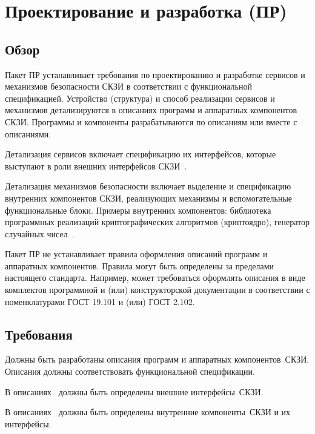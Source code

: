 \section{Проектирование и разработка (ПР)}\label{DI}

\subsection{Обзор}\label{DI.Intro}

Пакет ПР устанавливает требования по проектированию и разработке сервисов и
механизмов безопасности СКЗИ в соответствии с функциональной
спецификацией.
%
Устройство (структура) и способ реализации сервисов и механизмов 
детализируются в описаниях программ и аппаратных компонентов СКЗИ.
%
Программы и компоненты разрабатываются по описаниям или вместе с описаниями. 

Детализация сервисов включает спецификацию их интерфейсов, которые 
выступают в роли внешних интерфейсов СКЗИ~.

Детализация механизмов безопасности включает выделение и спецификацию 
внутренних компонентов СКЗИ, реализующих механизмы и вспомогательные 
функциональные блоки.
%
Примеры внутренних компонентов: 
библиотека программных реализаций криптографических алгоритмов (криптоядро),
генератор случайных чисел~.

Пакет ПР не устанавливает правила оформления описаний программ и 
аппаратных компонентов. Правила могут быть определены за пределами настоящего 
стандарта. Например, может требоваться оформлять описания в виде 
комплектов программной и (или) конструкторской документации 
в соответствии с номенклатурами ГОСТ 19.101 и (или) ГОСТ 2.102.

\subsection{Требования}\label{DI.Reqs}

\label{R.DI.Spec} %
Должны быть разработаны описания программ и аппаратных компонентов~СКЗИ.
Описания должны соответствовать функциональной спецификации.

\label{R.DI.HLD} %
В описаниях~
должны быть определены внешние интерфейсы~СКЗИ.

\label{R.DI.LLD} %
В описаниях~
должны быть определены внутренние компоненты~СКЗИ и их интерфейсы.

